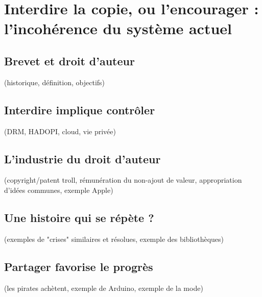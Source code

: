 \chapter{Interdire la copie, ou l'encourager : l'incohérence du système actuel}

\section{Brevet et droit d'auteur}
(historique, définition, objectifs)
\section{Interdire implique contrôler} %
(DRM, HADOPI, cloud, vie privée)
\section{L'industrie du droit d'auteur}
(copyright/patent troll, rémunération du non-ajout de valeur, appropriation d'idées communes, exemple Apple)
\section{Une histoire qui se répète ?}
(exemples de "crises" similaires et résolues, exemple des bibliothèques)
\section{Partager favorise le progrès}
(les pirates achètent, exemple de Arduino, exemple de la mode)
